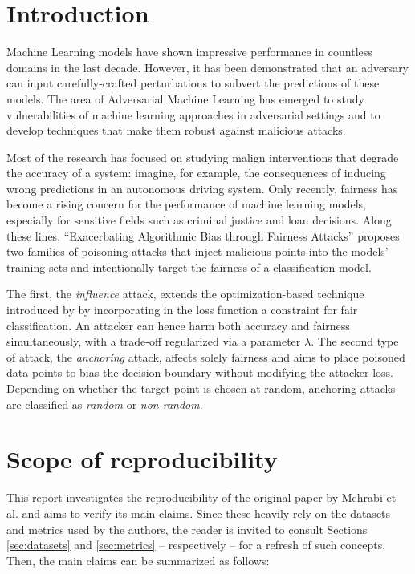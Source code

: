 
\section{Introduction}
Machine Learning models have shown impressive performance in countless domains in the last decade. However, it has been demonstrated that an adversary can input carefully-crafted perturbations to subvert the predictions of these models. The area of Adversarial Machine Learning has emerged to study vulnerabilities of machine learning approaches in adversarial settings and to develop techniques that make them robust against malicious attacks.

Most of the research has focused on studying malign interventions that degrade the accuracy of a system: imagine, for example, the consequences of inducing wrong predictions in an autonomous driving system. Only recently, fairness has become a rising concern for the performance of machine learning models, especially for sensitive fields such as criminal justice and loan decisions. Along these lines, “Exacerbating Algorithmic Bias through Fairness Attacks” \citep{originalpaper} proposes two families of poisoning attacks that inject malicious points into the models’ training sets and intentionally target the fairness of a classification model.

The first, the \textit{influence} attack, extends the optimization-based technique introduced by \citet{koh2018} by incorporating in the loss function a constraint for fair classification. An attacker can hence harm both accuracy and fairness simultaneously, with a trade-off regularized via a parameter $\lambda$. The second type of attack, the \textit{anchoring} attack, affects solely fairness and aims to place poisoned data points to bias the decision boundary without modifying the attacker loss. Depending on whether the target point is chosen at random, anchoring attacks are classified as \textit{random} or \textit{non-random}.
\section{Scope of reproducibility}
\label{sec:claims}

This report investigates the reproducibility of the original paper by Mehrabi et al. and aims to verify its main claims. Since these heavily rely on the datasets and metrics used by the authors, the reader is invited to consult Sections \ref{sec:datasets} and \ref{sec:metrics} -- respectively -- for a refresh of such concepts. Then, the main claims can be summarized as follows:

